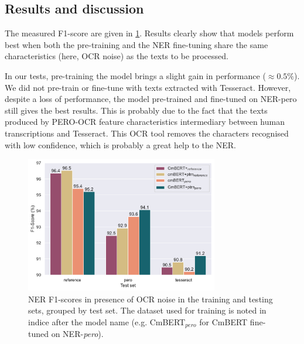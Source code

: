 


\subsection{Results and discussion}
The measured F1-score are given in \cref{fig:exp_2_eval_ner}.
Results clearly show that models perform best when both the pre-training and the NER fine-tuning share the same characteristics (here, OCR noise) as the texts to be processed.

In our tests, pre-training the model brings a slight gain in performance ($\approx 0.5\%$).
We did not pre-train or fine-tune with texts extracted with Tesseract.
However, despite a loss of performance, the model pre-trained and fine-tuned on NER-pero still gives the best results.
This is probably due to the fact that the texts produced by PERO-OCR feature characteristics intermediary between human transcriptions and Tesseract.
This OCR tool removes the characters recognised with low confidence, which is probably a great help to the NER.

\begin{figure}
    \centering
    \includegraphics[width=0.75\textwidth]{images/experiment_2_f1_with_noise_graph.pdf}
    \caption{\label{fig:exp_2_eval_ner}NER F1-scores in presence of OCR noise in the training and testing sets, grouped by test set. The dataset used for training is noted in indice after the model name (e.g. CmBERT$_{pero}$ for CmBERT fine-tuned on NER-\emph{pero}).}
\end{figure}

